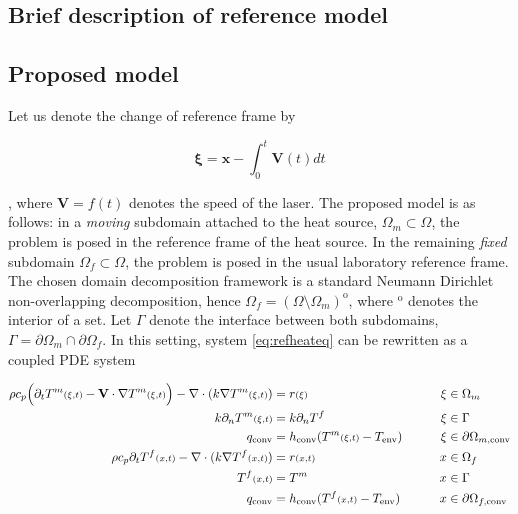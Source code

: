 \subsection{Brief description of reference model}
  

\subsection{Proposed model}

Let us denote the change of reference frame by

$$
\mathbf{\xi} = \mathbf{x} - \int_0^t \mathbf{V}(t) dt
$$

, where $\mathbf{V} = f(t)$ denotes the
speed of the laser.
The proposed model is as follows:
in a \textit{moving} subdomain attached to the heat source,
$\Omega_m \subset \Omega$,
the problem is posed in the reference frame of the heat source.
In the remaining
\textit{fixed} subdomain $\Omega_f \subset \Omega$,
the problem is posed
in the usual laboratory reference frame.
The chosen domain decomposition framework is
a standard Neumann Dirichlet non-overlapping decomposition,
hence $\Omega_f = (\Omega \setminus \Omega_m)^{\mathrm{o}}$,
where ${}^{\mathrm{o}}$ denotes the interior of a set. Let
$\Gamma$ denote the interface between both subdomains,
$\Gamma = \partial \Omega_m \cap \partial \Omega_f$. In this
setting, system \eqref{eq:refheateq} can be rewritten as
a coupled PDE system

\begin{align}
  \rho c_p \Big( \partial_t T^m{\scriptstyle (\xi, t)} - \mathbf{V} \cdot \nabla T^m{\scriptstyle (\xi, t)} \Big) -
  \nabla \cdot ( k \nabla T^m{\scriptstyle (\xi, t)}) &= r{\scriptstyle (\xi)}  &\xi &\in \Omega_m \label{eq:pdeddm}\\
  k \partial_n T^m{\scriptstyle (\xi, t)} &= k \partial_n T^f  &\xi &\in \Gamma \notag\\
  q_{\textrm{conv}} &= h_{\textrm{conv}} ( T^m{\scriptstyle(\xi,t)} - T_{\textrm{env}} ) \qquad &\xi &\in \partial \Omega_{m, \textrm{conv}}\notag\\
  \rho c_p \partial_t T^f{\scriptstyle (x, t)} - \nabla \cdot (k \nabla T^f{\scriptstyle (x, t)}) &= r{\scriptstyle (x, t)} \qquad &x &\in \Omega_f \label{eq:pdedf}\\
  T^f{\scriptstyle (x, t)} &= T^m \qquad &x &\in \Gamma \label{eq:dirichletdf}\\
  q_{\textrm{conv}} &= h_{\textrm{conv}} ( T^f{\scriptstyle(x,t)} - T_{\textrm{env}} ) \qquad &x &\in \partial \Omega_{f, \textrm{conv}}\notag
\end{align}

